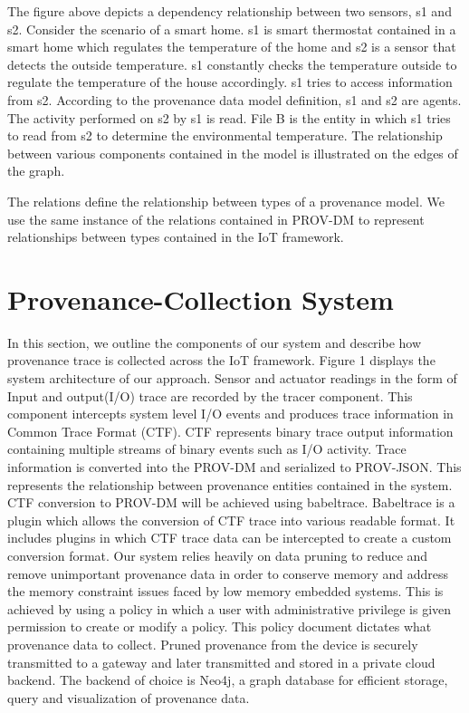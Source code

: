 The figure above depicts a dependency relationship between two sensors, s1 and s2. Consider the scenario of a smart home. s1 is smart thermostat contained in a smart home which regulates the temperature of the home and s2 is a sensor that detects the outside temperature. s1 constantly checks the temperature outside to regulate the temperature of the house accordingly. s1 tries to access information from s2. According to the provenance data model  definition, s1 and s2 are agents. The activity performed on s2 by s1 is read. File B is the entity in which s1 tries to read from s2 to determine the environmental temperature. The relationship between various components contained in the model is illustrated on the edges of the graph.

\par The relations define the relationship between types of a provenance model. We use the same instance of the relations contained in PROV-DM to represent relationships between types contained in the IoT framework.


\section{Provenance-Collection System}

In this section, we outline the components of our system and describe how provenance trace is collected across the IoT framework. Figure 1 displays the system architecture of our approach. Sensor and actuator readings in the form of Input and output(I/O) trace are recorded by the tracer component. This component intercepts system level I/O events and produces trace information in Common Trace Format (CTF). CTF represents binary trace output information containing multiple streams of binary events such as I/O activity. Trace information is converted into the PROV-DM and serialized to PROV-JSON. This represents the relationship between provenance entities contained in the system. CTF conversion to PROV-DM will be achieved using babeltrace. Babeltrace is a plugin which allows the conversion of CTF trace into various readable format. It includes plugins in which CTF trace data can be intercepted to create a custom conversion format. Our system relies heavily on data pruning to reduce and remove unimportant provenance data in order to conserve memory and address the memory constraint issues faced by low memory embedded systems. This is achieved by using a policy in which a user with administrative privilege is given permission to create or modify a policy. This policy document dictates what provenance data to collect. Pruned provenance from the device is securely transmitted to a gateway and later transmitted and stored in a private cloud backend. The backend of choice is Neo4j, a graph database for efficient storage, query and visualization of provenance data.

